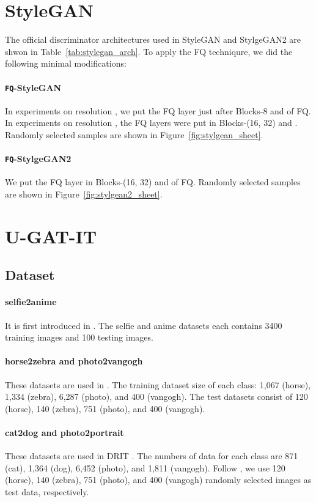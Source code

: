 \documentclass{article}
\begin{document}
\section{StyleGAN}
The official discriminator architectures used in StyleGAN and StylgeGAN2 are shwon in Table~\ref{tab:stylegan_arch}. To apply the FQ techniqure, we did the following minimal modifications:
\paragraph{\textbf{\texttt{FQ}}-StyleGAN} In experiments on resolution , we put the FQ layer just after Blocks-8 and  of FQ. In experiments on resolution , the FQ layers were put in Blocks-(16, 32) and . Randomly selected samples are shown in Figure~\ref{fig:stylgean_sheet}.
\paragraph{\textbf{\texttt{FQ}}-StylgeGAN2} We put the FQ layer in Blocks-(16, 32) and  of FQ. Randomly selected samples are shown in Figure~\ref{fig:stylgean2_sheet}.

\section{U-GAT-IT}
\subsection{Dataset}

\paragraph{selfie2anime} It is first introduced in \citep{kim2019u}. The selfie and anime datasets each contains 3400 training images and 100 testing images.
\paragraph{horse2zebra and photo2vangogh} These datasets are used in \citep{zhu2017unpaired}. The training dataset size of each class: 1,067 (horse), 1,334 (zebra), 6,287 (photo), and 400 (vangogh). The test datasets consist of 120 (horse), 140 (zebra), 751 (photo), and 400 (vangogh). 
\paragraph{cat2dog and photo2portrait} These datasets are used in DRIT \citep{lee2018diverse}. The numbers of data for each class are 871 (cat), 1,364 (dog), 6,452 (photo), and 1,811 (vangogh). Follow \citep{kim2019u}, we use 120 (horse), 140 (zebra), 751 (photo), and 400 (vangogh) randomly selected images as test data, respectively.
\end{document}
